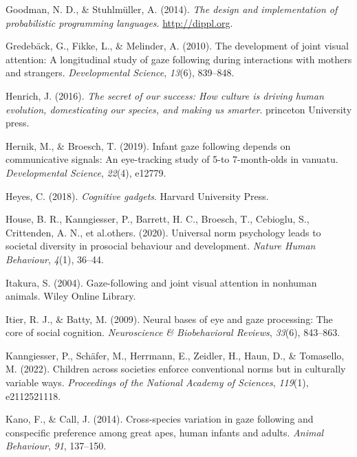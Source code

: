 \documentclass[
  man,floatsintext]{apa6}
\newlength{\cslhangindent}
\newlength{\cslentryspacingunit} %
\newenvironment{CSLReferences}[2] %
 {%
  \setlength{\parindent}{0pt}
  \ifodd #1
  \let\oldpar\par
  \def\par{\hangindent=\cslhangindent\oldpar}
  \fi
  \setlength{\parskip}{#2\cslentryspacingunit}
 }%
 {}
\begin{document}
\begin{CSLReferences}{1}{0}
\leavevmode{}%
Goodman, N. D., \& Stuhlmüller, A. (2014). \emph{{The design and implementation of probabilistic programming languages}}. \url{http://dippl.org}.

\leavevmode{}%
Gredebäck, G., Fikke, L., \& Melinder, A. (2010). The development of joint visual attention: A longitudinal study of gaze following during interactions with mothers and strangers. \emph{Developmental Science}, \emph{13}(6), 839--848.

\leavevmode{}%
Henrich, J. (2016). \emph{The secret of our success: How culture is driving human evolution, domesticating our species, and making us smarter}. princeton University press.

\leavevmode{}%
Hernik, M., \& Broesch, T. (2019). Infant gaze following depends on communicative signals: An eye-tracking study of 5-to 7-month-olds in vanuatu. \emph{Developmental Science}, \emph{22}(4), e12779.

\leavevmode{}%
Heyes, C. (2018). \emph{Cognitive gadgets}. Harvard University Press.

\leavevmode{}%
House, B. R., Kanngiesser, P., Barrett, H. C., Broesch, T., Cebioglu, S., Crittenden, A. N., et al.others. (2020). Universal norm psychology leads to societal diversity in prosocial behaviour and development. \emph{Nature Human Behaviour}, \emph{4}(1), 36--44.

\leavevmode{}%
Itakura, S. (2004). Gaze-following and joint visual attention in nonhuman animals. Wiley Online Library.

\leavevmode{}%
Itier, R. J., \& Batty, M. (2009). Neural bases of eye and gaze processing: The core of social cognition. \emph{Neuroscience \& Biobehavioral Reviews}, \emph{33}(6), 843--863.

\leavevmode{}%
Kanngiesser, P., Schäfer, M., Herrmann, E., Zeidler, H., Haun, D., \& Tomasello, M. (2022). Children across societies enforce conventional norms but in culturally variable ways. \emph{Proceedings of the National Academy of Sciences}, \emph{119}(1), e2112521118.

\leavevmode{}%
Kano, F., \& Call, J. (2014). Cross-species variation in gaze following and conspecific preference among great apes, human infants and adults. \emph{Animal Behaviour}, \emph{91}, 137--150.


\end{CSLReferences}
\end{document}
